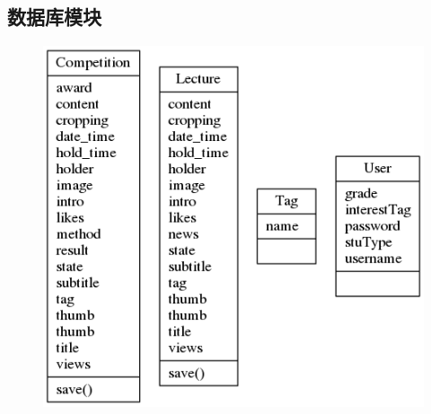 \documentclass[UTF8]{ctexart}
\begin{document}
\begin{spacing}{1.3}
\subsection{数据库模块}
		\begin{figure}[H]
				\centering
				\includegraphics[width=\textwidth]{classes_model.png}
		\end{figure}

\end{spacing}
\end{document}
